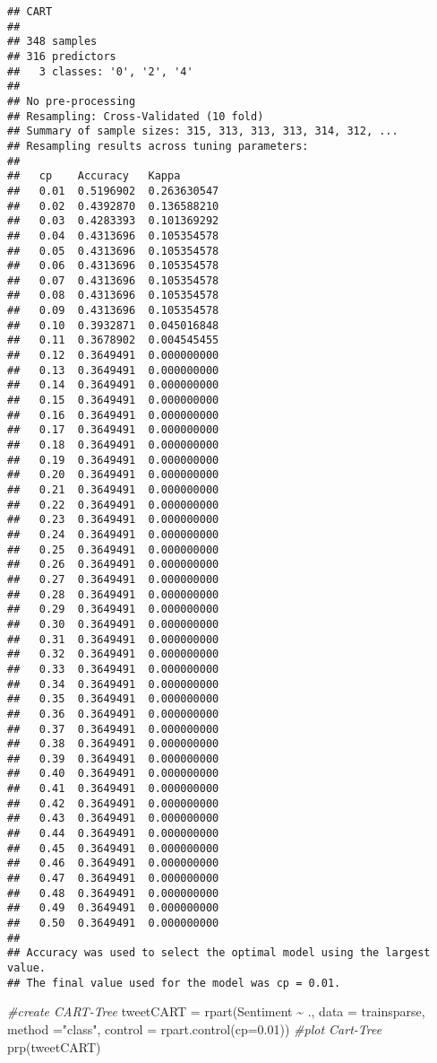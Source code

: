 \documentclass[
]{article}
\newenvironment{Shaded}{\begin{snugshade}}{\end{snugshade}}
\newcommand{\AttributeTok}[1]{\textcolor[rgb]{0.77,0.63,0.00}{#1}}
\newcommand{\CommentTok}[1]{\textcolor[rgb]{0.56,0.35,0.01}{\textit{#1}}}
\newcommand{\FloatTok}[1]{\textcolor[rgb]{0.00,0.00,0.81}{#1}}
\newcommand{\FunctionTok}[1]{\textcolor[rgb]{0.00,0.00,0.00}{#1}}
\newcommand{\NormalTok}[1]{#1}
\newcommand{\OtherTok}[1]{\textcolor[rgb]{0.56,0.35,0.01}{#1}}
\newcommand{\SpecialCharTok}[1]{\textcolor[rgb]{0.00,0.00,0.00}{#1}}
\newcommand{\StringTok}[1]{\textcolor[rgb]{0.31,0.60,0.02}{#1}}
\begin{document}
\begin{verbatim}
## CART 
## 
## 348 samples
## 316 predictors
##   3 classes: '0', '2', '4' 
## 
## No pre-processing
## Resampling: Cross-Validated (10 fold) 
## Summary of sample sizes: 315, 313, 313, 313, 314, 312, ... 
## Resampling results across tuning parameters:
## 
##   cp    Accuracy   Kappa      
##   0.01  0.5196902  0.263630547
##   0.02  0.4392870  0.136588210
##   0.03  0.4283393  0.101369292
##   0.04  0.4313696  0.105354578
##   0.05  0.4313696  0.105354578
##   0.06  0.4313696  0.105354578
##   0.07  0.4313696  0.105354578
##   0.08  0.4313696  0.105354578
##   0.09  0.4313696  0.105354578
##   0.10  0.3932871  0.045016848
##   0.11  0.3678902  0.004545455
##   0.12  0.3649491  0.000000000
##   0.13  0.3649491  0.000000000
##   0.14  0.3649491  0.000000000
##   0.15  0.3649491  0.000000000
##   0.16  0.3649491  0.000000000
##   0.17  0.3649491  0.000000000
##   0.18  0.3649491  0.000000000
##   0.19  0.3649491  0.000000000
##   0.20  0.3649491  0.000000000
##   0.21  0.3649491  0.000000000
##   0.22  0.3649491  0.000000000
##   0.23  0.3649491  0.000000000
##   0.24  0.3649491  0.000000000
##   0.25  0.3649491  0.000000000
##   0.26  0.3649491  0.000000000
##   0.27  0.3649491  0.000000000
##   0.28  0.3649491  0.000000000
##   0.29  0.3649491  0.000000000
##   0.30  0.3649491  0.000000000
##   0.31  0.3649491  0.000000000
##   0.32  0.3649491  0.000000000
##   0.33  0.3649491  0.000000000
##   0.34  0.3649491  0.000000000
##   0.35  0.3649491  0.000000000
##   0.36  0.3649491  0.000000000
##   0.37  0.3649491  0.000000000
##   0.38  0.3649491  0.000000000
##   0.39  0.3649491  0.000000000
##   0.40  0.3649491  0.000000000
##   0.41  0.3649491  0.000000000
##   0.42  0.3649491  0.000000000
##   0.43  0.3649491  0.000000000
##   0.44  0.3649491  0.000000000
##   0.45  0.3649491  0.000000000
##   0.46  0.3649491  0.000000000
##   0.47  0.3649491  0.000000000
##   0.48  0.3649491  0.000000000
##   0.49  0.3649491  0.000000000
##   0.50  0.3649491  0.000000000
## 
## Accuracy was used to select the optimal model using the largest value.
## The final value used for the model was cp = 0.01.
\end{verbatim}

\begin{Shaded}
\begin{Highlighting}[]
\CommentTok{\#create CART{-}Tree}
\NormalTok{tweetCART }\OtherTok{=} \FunctionTok{rpart}\NormalTok{(Sentiment }\SpecialCharTok{\textasciitilde{}}\NormalTok{ ., }\AttributeTok{data =}\NormalTok{ trainsparse, }\AttributeTok{method =}\StringTok{"class"}\NormalTok{, }\AttributeTok{control =} \FunctionTok{rpart.control}\NormalTok{(}\AttributeTok{cp=}\FloatTok{0.01}\NormalTok{))  }
\CommentTok{\#plot Cart{-}Tree}
\FunctionTok{prp}\NormalTok{(tweetCART)}
\end{Highlighting}
\end{Shaded}
\end{document}
